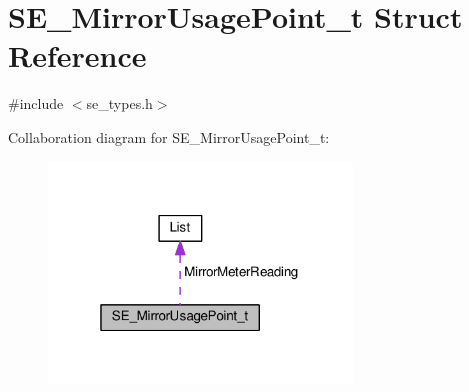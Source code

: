 \hypertarget{structSE__MirrorUsagePoint__t}{}\section{S\+E\+\_\+\+Mirror\+Usage\+Point\+\_\+t Struct Reference}
\label{structSE__MirrorUsagePoint__t}


{\ttfamily \#include $<$se\+\_\+types.\+h$>$}



Collaboration diagram for S\+E\+\_\+\+Mirror\+Usage\+Point\+\_\+t\+:\nopagebreak
\begin{figure}[H]
\begin{center}
\leavevmode
\includegraphics[width=229pt]{structSE__MirrorUsagePoint__t__coll__graph}
\end{center}
\end{figure}
